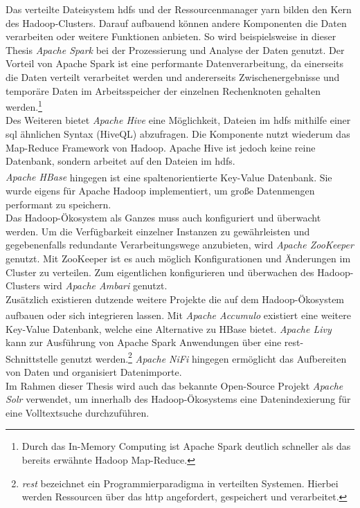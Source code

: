 \noindent
Das verteilte Dateisystem \gls{hdfs} und der Ressourcenmanager \acrshort{yarn} bilden den Kern des Hadoop-Clusters. Darauf aufbauend können andere Komponenten die Daten verarbeiten oder weitere Funktionen anbieten.
So wird beispielsweise in dieser Thesis \textit{Apache Spark\texttrademark\thinspace} bei der Prozessierung und Analyse der Daten genutzt. Der Vorteil von Apache Spark ist eine performante Datenverarbeitung, da einerseits die Daten verteilt verarbeitet werden und andererseits Zwischenergebnisse und temporäre Daten im Arbeitsspeicher der einzelnen Rechenknoten gehalten werden.\footnote{Durch das In-Memory Computing ist Apache Spark deutlich schneller als das bereits erwähnte Hadoop Map-Reduce.}\\
Des Weiteren bietet \textit{Apache Hive\texttrademark\thinspace} eine Möglichkeit, Dateien im \gls{hdfs} mithilfe einer \acrshort{sql} ähnlichen Syntax (HiveQL) abzufragen. Die Komponente nutzt wiederum das Map-Reduce Framework von Hadoop. Apache Hive ist jedoch keine reine Datenbank, sondern arbeitet auf den Dateien im \gls{hdfs}.\\
\textit{Apache HBase\textsuperscript{\textregistered}} hingegen ist eine spaltenorientierte Key-Value Datenbank. Sie wurde eigens für Apache Hadoop implementiert, 
um große Datenmengen performant zu speichern.\\

\noindent
Das Hadoop-Ökosystem als Ganzes muss auch konfiguriert und überwacht werden. Um die Verfügbarkeit einzelner Instanzen zu gewährleisten und gegebenenfalls redundante Verarbeitungswege anzubieten, wird \textit{Apache ZooKeeper\texttrademark\thinspace} genutzt. Mit ZooKeeper ist es auch möglich Konfigurationen und Änderungen im Cluster zu verteilen. Zum eigentlichen konfigurieren und überwachen des Hadoop-Clusters wird \textit{Apache Ambari\texttrademark\thinspace} genutzt.\\

\noindent
Zusätzlich existieren dutzende weitere Projekte die auf dem Hadoop-Ökosystem aufbauen oder sich integrieren lassen. Mit \textit{Apache Accumulo\textsuperscript{\textregistered}} existiert eine weitere Key-Value Datenbank, welche eine Alternative zu HBase bietet. \textit{Apache Livy} kann zur Ausführung von Apache Spark Anwendungen über eine \acrshort{rest}-Schnittstelle genutzt werden.\footnote{\textit{\gls{rest}} bezeichnet ein Programmierparadigma in verteilten Systemen. Hierbei werden Ressourcen über das \gls{http} angefordert, gespeichert und verarbeitet.} \textit{Apache NiFi} hingegen ermöglicht das Aufbereiten von Daten und organisiert Datenimporte.\\
Im Rahmen dieser Thesis wird auch das bekannte Open-Source Projekt \textit{Apache Solr\texttrademark\thinspace} verwendet, um innerhalb des Hadoop-Ökosystems eine Datenindexierung für eine Volltextsuche durchzuführen.\\


